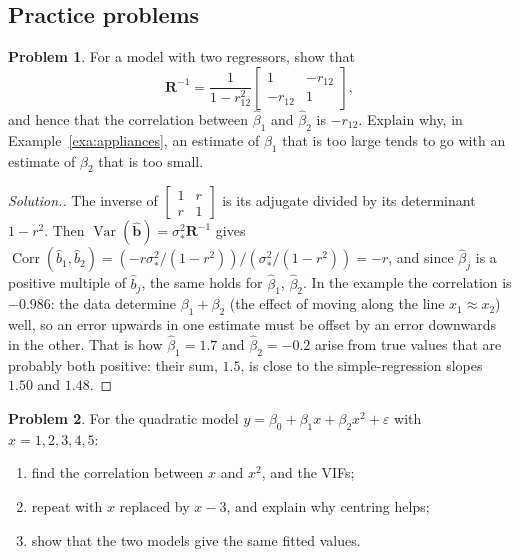 \documentclass[11pt,a4paper]{article}
\numberwithin{equation}{section}
\theoremstyle{definition}
\newtheorem{problemx}{Problem}[subsection]
\newenvironment{problem}{\begin{problemx}}{\end{problemx}}
\newenvironment{solution}
  {\renewcommand{\qedsymbol}{}\begin{proof}[\textit{Solution}.]}
  {\end{proof}}
\begin{document}
\subsection{Practice problems}
\begin{problem}\label{prob:two-reg-corr}
For a model with two regressors, show that
\[
\mathbf{R}^{-1} = \frac{1}{1 - r_{12}^2}\begin{bmatrix} 1 & -r_{12} \\ -r_{12} & 1 \end{bmatrix} ,
\]
and hence that the correlation between $\hat\beta_1$ and $\hat\beta_2$ is $-r_{12}$. Explain why, in
Example~\ref{exa:appliances}, an estimate of $\beta_1$ that is too large tends to go with an estimate of
$\beta_2$ that is too small.
\end{problem}

\begin{solution}
The inverse of $\begin{bmatrix} 1 & r \\ r & 1 \end{bmatrix}$ is its adjugate divided by its determinant
$1 - r^2$. Then $\operatorname{Var}(\hat{\mathbf{b}}) = \sigma_*^2\mathbf{R}^{-1}$ gives
$\operatorname{Corr}(\hat b_1, \hat b_2) = (-r\sigma_*^2/(1 - r^2))\big/(\sigma_*^2/(1 - r^2)) = -r$, and since
$\hat\beta_j$ is a positive multiple of $\hat b_j$, the same holds for $\hat\beta_1$, $\hat\beta_2$. In the
example the correlation is $-0.986$: the data determine $\beta_1 + \beta_2$ (the effect of moving along the
line $x_1 \approx x_2$) well, so an error upwards in one estimate must be offset by an error downwards in the
other. That is how $\hat\beta_1 = 1.7$ and $\hat\beta_2 = -0.2$ arise from true values that are probably both
positive: their sum, $1.5$, is close to the simple-regression slopes $1.50$ and $1.48$.
\end{solution}

\begin{problem}\label{prob:centring}
For the quadratic model $y = \beta_0 + \beta_1x + \beta_2x^2 + \varepsilon$ with $x = 1, 2, 3, 4, 5$:
\begin{enumerate}[label=(\alph*)]
\item find the correlation between $x$ and $x^2$, and the VIFs;
\item repeat with $x$ replaced by $x - 3$, and explain why centring helps;
\item show that the two models give the same fitted values.
\end{enumerate}
\end{problem}
\end{document}

